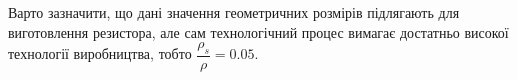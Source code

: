 \documentclass[a4paper,14pt]{extreport}
\begin{document}
Варто зазначити, що дані значення геометричних розмірів підлягають для 
виготовлення резистора, але сам технологічний процес вимагає достатньо високої технології виробництва, тобто $\dfrac{\rho_s}{\rho} = 0.05$.












\end{document}
